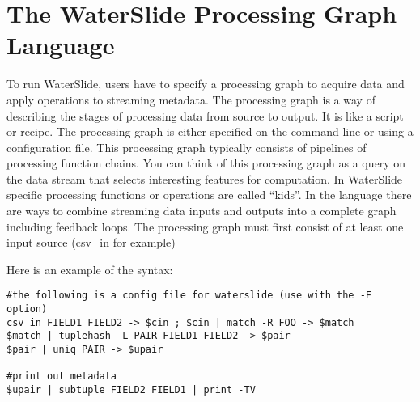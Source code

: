\documentclass[11pt]{article}
\begin{document}
\section {The WaterSlide Processing Graph Language}
To run WaterSlide, users have to specify a processing graph to acquire data and apply operations to 
streaming metadata. The processing graph is a way of describing the stages of processing data from
source to output.  It is like a script or recipe.  The processing graph is either specified on the command line or using a
configuration file.  This processing graph typically consists of pipelines of processing function
chains.  You can think of this processing graph as a query on the data stream that selects
interesting features for computation.  In WaterSlide specific processing functions or operations are called ``kids''.
In the language there are ways to
combine streaming data inputs and outputs into a complete graph including feedback loops.
The processing graph must first consist of at least one input source (csv\_in for example)

Here is an example of the syntax:
\begin{lstlisting}
#the following is a config file for waterslide (use with the -F option)
csv_in FIELD1 FIELD2 -> $cin ; $cin | match -R FOO -> $match
$match | tuplehash -L PAIR FIELD1 FIELD2 -> $pair
$pair | uniq PAIR -> $upair

#print out metadata
$upair | subtuple FIELD2 FIELD1 | print -TV
\end{lstlisting}
\end{document}
